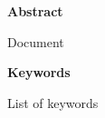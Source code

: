 
\newpage

\thispagestyle{empty}

\begin{center}

{\bf \Huge Abstract}

  \end{center}
\vspace{1cm}

Document

\vspace{1cm}


\begin{center}

{\bf \Large Keywords}

   \end{center}

   \vspace{0.5cm}
   
List of keywords
   


